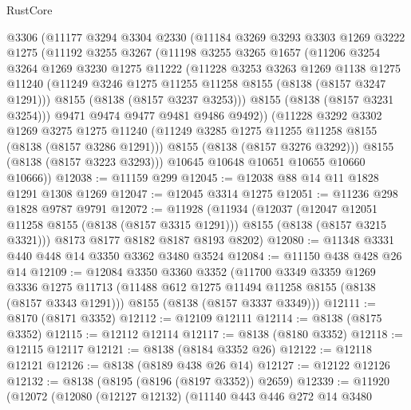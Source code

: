 \begin{lexlean}{RustCore}
\begin{coremodule}
      @3306
      (@11177
        @3294
        @3304
        @2330
        (@11184
          @3269
          @3293
          @3303
          @1269
          @3222
          @1275
          (@11192
            @3255
            @3267
            (@11198
              @3255
              @3265
              @1657
              (@11206
                @3254
                @3264
                @1269
                @3230
                @1275
                @11222
                (@11228
                  @3253
                  @3263
                  @1269
                  @1138
                  @1275
                  @11240
                  (@11249 @3246 @1275 @11255 @11258 @8155 (@8138 (@8157 @3247 @1291)))
                  @8155
                  (@8138 (@8157 @3237 @3253)))
                @8155
                (@8138 (@8157 @3231 @3254)))
              @9471
              @9474
              @9477
              @9481
              @9486
              @9492))
          (@11228
            @3292
            @3302
            @1269
            @3275
            @1275
            @11240
            (@11249 @3285 @1275 @11255 @11258 @8155 (@8138 (@8157 @3286 @1291)))
            @8155
            (@8138 (@8157 @3276 @3292)))
          @8155
          (@8138 (@8157 @3223 @3293)))
        @10645
        @10648
        @10651
        @10655
        @10660
        @10666))
@12038 := @11159 @299
@12045 := @12038 @88 @14 @11 @1828 @1291 @1308 @1269
@12047 := @12045 @3314 @1275
@12051 := @11236 @298 @1828 @9787 @9791
@12072 := @11928
    (@11934
      (@12037
        (@12047 @12051 @11258 @8155 (@8138 (@8157 @3315 @1291)))
        @8155
        (@8138 (@8157 @3215 @3321)))
      @8173
      @8177
      @8182
      @8187
      @8193
      @8202)
@12080 := @11348 @3331 @440 @448 @14 @3350 @3362 @3480 @3524
@12084 := @11150 @438 @428 @26 @14
@12109 := @12084
    @3350
    @3360
    @3352
    (@11700
      @3349
      @3359
      @1269
      @3336
      @1275
      @11713
      (@11488 @612 @1275 @11494 @11258 @8155 (@8138 (@8157 @3343 @1291)))
      @8155
      (@8138 (@8157 @3337 @3349)))
@12111 := @8170 (@8171 @3352)
@12112 := @12109 @12111
@12114 := @8138 (@8175 @3352)
@12115 := @12112 @12114
@12117 := @8138 (@8180 @3352)
@12118 := @12115 @12117
@12121 := @8138 (@8184 @3352 @26)
@12122 := @12118 @12121
@12126 := @8138 (@8189 @438 @26 @14)
@12127 := @12122 @12126
@12132 := @8138 (@8195 (@8196 (@8197 @3352)) @2659)
@12339 := @11920
    (@12072
      (@12080
        (@12127 @12132)
        (@11140
          @443
          @446
          @272
          @14
          @3480

\end{coremodule}
\end{lexlean}
